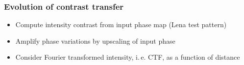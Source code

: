 \documentclass{beamer}
\newcommand{\ie}{i.\,e.}
\renewcommand{\vec}{\mathbold}
\newcommand{\vecxi}{\vec{\xi}}
\newcommand{\abs}[1]{\left| #1 \right|} %
\newcommand{\F}{\mathcal{F}}
\begin{document}
\begin{frame}
  \frametitle{Evolution of contrast transfer}
  \begin{itemize}
  \item Compute intensity contrast from input phase map (Lena test pattern)
  \item Amplify phase variations by upscaling of input phase
  \item Consider Fourier transformed intensity, \ie{} CTF, as a
    function of distance
  \end{itemize}
  \begin{columns}
\end{columns}
\end{frame}
\end{document}
